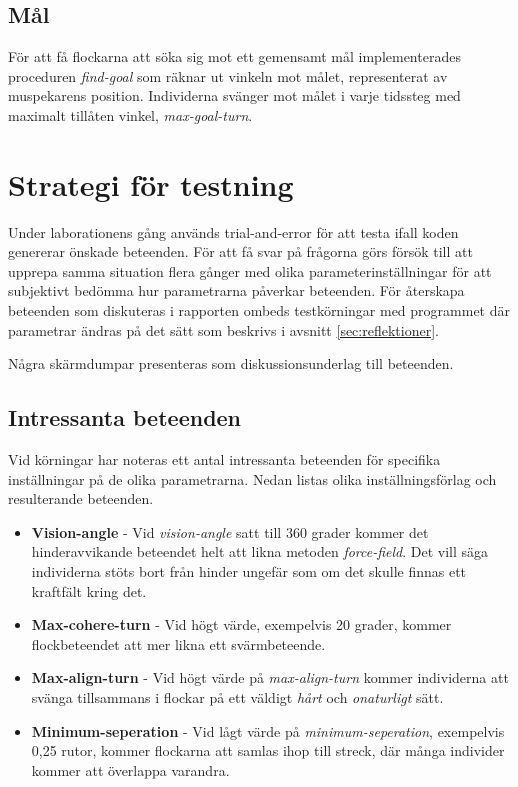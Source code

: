 \documentclass[titlepage, a4paper, 12pt]{article}
\begin{document}
\subsection{Mål}
För att få flockarna att söka sig mot ett gemensamt mål
implementerades proceduren \textit{find-goal} som räknar ut vinkeln
mot målet, representerat av mus\-pekarens position. Individerna svänger
mot målet i varje tidssteg med maximalt tillåten vinkel,
\textit{max-goal-turn}.

\section{Strategi för testning}
Under laborationens gång används trial-and-error för att testa ifall
koden genererar önskade beteenden. För att få svar på frågorna görs
försök till att upprepa samma situation flera gånger med olika
parameterinställningar för att subjektivt bedömma hur parametrarna
påverkar beteenden. För återskapa beteenden som diskuteras i rapporten
ombeds testkörningar med programmet där parametrar ändras på det sätt
som beskrivs i avsnitt \ref{sec:reflektioner}.

Några skärmdumpar presenteras som diskussionsunderlag till beteenden.

\subsection{Intressanta beteenden}
Vid körningar har noteras ett antal intressanta beteenden för
specifika inställningar på de olika parametrarna. Nedan listas olika
inställningsförlag och resulterande beteenden.

\begin{itemize}
\item \textbf{Vision-angle} - Vid \textit{vision-angle} satt till 360
  grader kommer det hinderavvikande beteendet helt att likna metoden
  \textit{force-field}. Det vill säga individerna stöts bort från
  hinder ungefär som om det skulle finnas ett kraftfält kring det.
  
\item \textbf{Max-cohere-turn} - Vid högt värde, exempelvis 20 grader,
  kommer flockbeteendet att mer likna ett svärmbeteende.
  
\item \textbf{Max-align-turn} - Vid högt värde på
  \textit{max-align-turn} kommer individerna att svänga tillsammans i
  flockar på ett väldigt \textit{hårt} och \textit{onaturligt} sätt.

\item \textbf{Minimum-seperation} - Vid lågt värde på
  \textit{minimum-seperation}, exempelvis 0,25 rutor, kommer flockarna
  att samlas ihop till streck, där många individer kommer att
  överlappa varandra.
\end{itemize}
\end{document}
